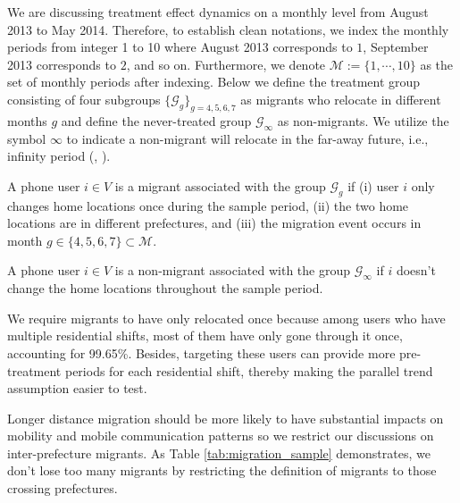 We are discussing treatment effect dynamics on a monthly level from August 2013 to May 2014. Therefore, to establish clean notations, we index the monthly periods from integer 1 to 10 where August 2013 corresponds to $1$, September 2013 corresponds to $2$, and so on. Furthermore, we denote $\mathcal{M} := \{1, \cdots, 10\}$ as the set of monthly periods after indexing. Below we define the treatment group consisting of four subgroups $\{ \mathcal{G}_g \}_{g=4,5,6,7}$ as migrants who relocate in different months $g$ and define the never-treated group $\mathcal{G}_{\infty}$ as non-migrants. We utilize the symbol $\infty$ to indicate a non-migrant will relocate in the far-away future, i.e., infinity period (\cite{sun2021estimating}, \cite{borusyak2024revisiting}).

\begin{definition}[Migrants]\label{def:migrants}
A phone user $i \in V$ is a migrant associated with the group $\mathcal{G}_g$ if (i) user $i$ only changes home locations once during the sample period, (ii) the two home locations are in different prefectures, and (iii) the migration event occurs in month $g \in \{4,5,6,7\} \subset \mathcal{M}$.
\end{definition}

\begin{definition}
A phone user $i \in V$ is a non-migrant associated with the group $\mathcal{G}_{\infty}$ if $i$ doesn't change the home locations throughout the sample period.
\end{definition}

We require migrants to have only relocated once because among users who have multiple residential shifts, most of them have only gone through it once, accounting for 99.65\%. Besides, targeting these users can provide more pre-treatment periods for each residential shift, thereby making the parallel trend assumption easier to test.

Longer distance migration should be more likely to have substantial impacts on mobility and mobile communication patterns so we restrict our discussions on inter-prefecture migrants. As Table \ref{tab:migration_sample} demonstrates, we don't lose too many migrants by restricting the definition of migrants to those crossing prefectures.


